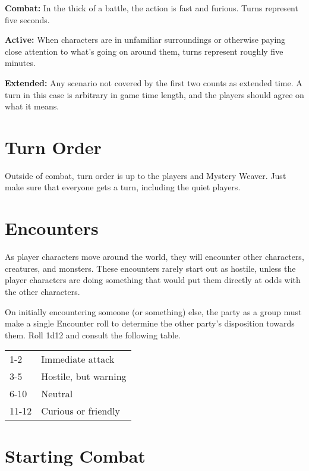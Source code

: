 \begin{multicols}{2}
\textbf{Combat:} In the thick of a battle, the action is fast and furious.
Turns represent five seconds.

\textbf{Active:} When characters are in unfamiliar surroundings or
otherwise paying close attention to what's going on around them, turns
represent roughly five minutes.

\textbf{Extended:} Any scenario not covered by the first two counts as
extended time. A turn in this case is arbitrary in game time length,
and the players should agree on what it means.

\section{Turn Order}

Outside of combat, turn order is up to the players and Mystery Weaver. Just
make sure that everyone gets a turn, including the quiet players.

\section{Encounters}

As player characters move around the world, they will encounter other
characters, creatures, and monsters. These encounters rarely start out
as hostile, unless the player characters are doing something that would
put them directly at odds with the other characters.

On initially encountering someone (or something) else, the party as a
group must make a single Encounter roll to determine the other party's
disposition towards them. Roll 1d12 and consult the following table.

\begin{center}
{
\begin{xtabular}{|l|l|}
1-2 & Immediate attack \\
3-5 & Hostile, but warning \\
6-10 &  Neutral \\
11-12 & Curious or friendly \\
\hline
\end{xtabular}
}
\end{center}

\section{Starting Combat}


\end{multicols}
